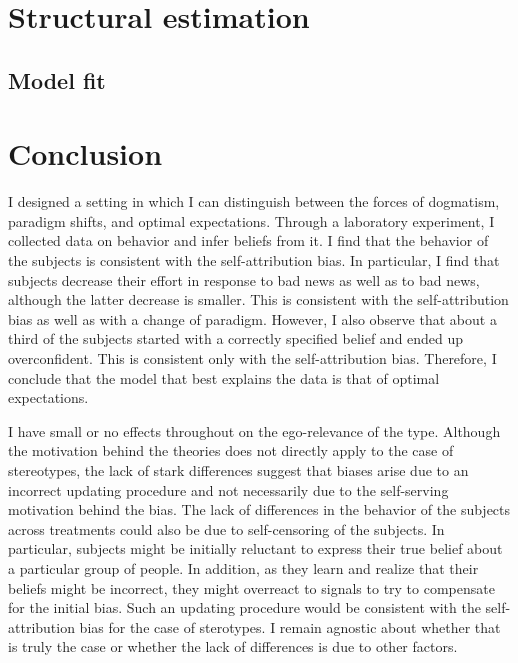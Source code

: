 \documentclass[
  12pt,
]{article}
\begin{document}
\hypertarget{structural-estimation}{%
\section{Structural estimation}\label{structural-estimation}}

\hypertarget{model-fit}{%
\subsection{Model fit}\label{model-fit}}

\hypertarget{conclusion}{%
\section{Conclusion}\label{conclusion}}

I designed a setting in which I can distinguish between the forces of
dogmatism, paradigm shifts, and optimal expectations. Through a
laboratory experiment, I collected data on behavior and infer beliefs
from it. I find that the behavior of the subjects is consistent with the
self-attribution bias. In particular, I find that subjects decrease
their effort in response to bad news as well as to bad news, although
the latter decrease is smaller. This is consistent with the
self-attribution bias as well as with a change of paradigm. However, I
also observe that about a third of the subjects started with a correctly
specified belief and ended up overconfident. This is consistent only
with the self-attribution bias. Therefore, I conclude that the model
that best explains the data is that of optimal expectations.

I have small or no effects throughout on the ego-relevance of the type.
Although the motivation behind the theories does not directly apply to
the case of stereotypes, the lack of stark differences suggest that
biases arise due to an incorrect updating procedure and not necessarily
due to the self-serving motivation behind the bias. The lack of
differences in the behavior of the subjects across treatments could also
be due to self-censoring of the subjects. In particular, subjects might
be initially reluctant to express their true belief about a particular
group of people. In addition, as they learn and realize that their
beliefs might be incorrect, they might overreact to signals to try to
compensate for the initial bias. Such an updating procedure would be
consistent with the self-attribution bias for the case of sterotypes. I
remain agnostic about whether that is truly the case or whether the lack
of differences is due to other factors.
\end{document}
